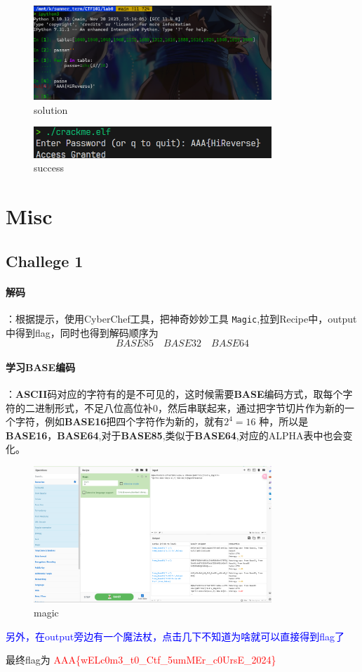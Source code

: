 \documentclass{article}
\begin{document}
\begin{itemize}
\begin{figure}[H]
        \includegraphics[width=0.8\textwidth]{./figure/solution.png}
        \caption{solution}
    \end{figure}
    \begin{figure}[H]
        \centering
        \includegraphics[width=0.8\textwidth]{./figure/success.png}
        \caption{success}
    \end{figure}
\end{itemize}    

\section*{Misc}
\subsection*{Challege 1}
\paragraph*{解码}：根据提示，使用CyberChef工具，把神奇妙妙工具 \texttt{Magic},拉到Recipe中，output中得到flag，同时也得到解码顺序为
$$ BASE85 \quad BASE32 \quad BASE64 $$
\paragraph*{学习BASE编码}：\textbf{ASCII}码对应的字符有的是不可见的，这时候需要\textbf{BASE}编码方式，取每个字符的二进制形式，不足八位高位补0，然后串联起来，通过把字节切片作为新的一个字符，例如\textbf{BASE16}把四个字符作为新的，就有$2^{4}=16$ 种，所以是\textbf{BASE16}，\textbf{BASE64},对于\textbf{BASE85},类似于\textbf{BASE64},对应的ALPHA表中也会变化。
\begin{figure}[H]
    \centering
    \includegraphics[width=0.8\textwidth]{./figure/cyberchef.png}
    \caption{magic}
\end{figure}
\textcolor{blue}{另外，在output旁边有一个魔法杖，点击几下不知道为啥就可以直接得到flag了}
\par 最终flag为\textcolor{red}{ AAA\{wELc0m3\_t0\_Ctf\_5umMEr\_c0UrsE\_2024\}}
\end{document}
